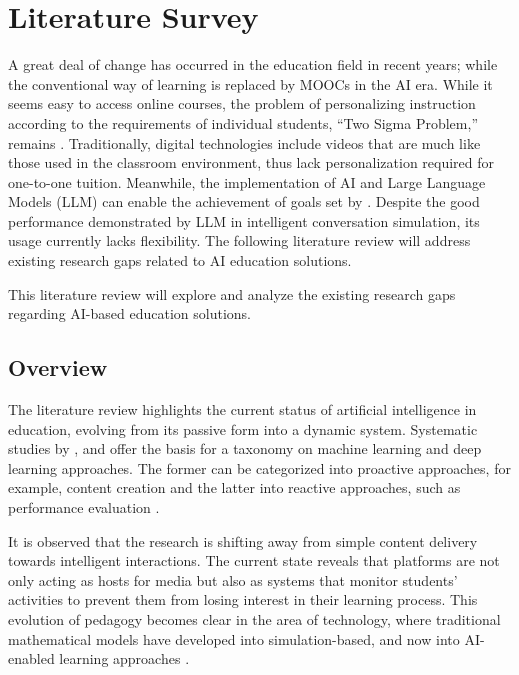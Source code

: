 \chapter{Literature Survey}

A great deal of change has occurred in the education field in recent years; while the conventional way of learning is replaced by MOOCs in the AI era. While it seems easy to access online courses, the problem of personalizing instruction according to the requirements of individual students, “Two Sigma Problem,” remains \cite{bloom1984}. Traditionally, digital technologies include videos that are much like those used in the classroom environment, thus lack personalization required for one-to-one tuition. Meanwhile, the implementation of AI and Large Language Models (LLM) can enable the achievement of goals set by \textcite{bloom1984}. Despite the good performance demonstrated by LLM in intelligent conversation simulation, its usage currently lacks flexibility. The following literature review will address existing research gaps related to AI education solutions.

This literature review will explore and analyze the existing research gaps regarding AI-based education solutions.

\section{Overview}

The literature review highlights the current status of artificial intelligence in education, evolving from its passive form into a dynamic system. Systematic studies by \textcite{chen2020}, \textcite{elbasi2025} and \textcite{agbewali2022} offer the basis for a taxonomy on machine learning and deep learning approaches. The former can be categorized into proactive approaches, for example, content creation and the latter into reactive approaches, such as performance evaluation \cite{mallik2023}. 

It is observed that the research is shifting away from simple content delivery towards intelligent interactions. The current state reveals that platforms are not only acting as hosts for media but also as systems that monitor students' activities to prevent them from losing interest in their learning process. This evolution of pedagogy becomes clear in the area of technology, where traditional mathematical models have developed into simulation-based, and now into AI-enabled learning approaches \cite{lopez2025, boldo2024}.

